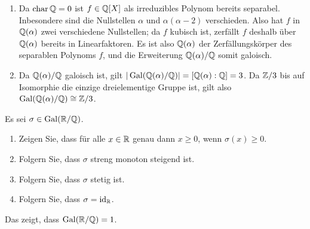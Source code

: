 \begin{solution}
\begin{enumerate}
    \item
      Da $\operatorname{char} \mathbb{Q} = 0$ ist $f \in \mathbb{Q}[X]$ als irreduzibles Polynom bereits separabel.
      Inbesondere sind die Nullstellen $\alpha$ und $\alpha (\alpha - 2)$ verschieden.
      Also hat $f$ in $\mathbb{Q}(\alpha)$ zwei verschiedene Nullstellen; da $f$ kubisch ist, zerfällt $f$ deshalb über $\mathbb{Q}(\alpha)$ bereits in Linearfaktoren.
      Es ist also $\mathbb{Q}(\alpha)$ der Zerfällungskörper des separablen Polynoms $f$, und die Erweiterung $\mathbb{Q}(\alpha)/\mathbb{Q}$ somit galoisch.
%       
    \item
      Da $\mathbb{Q}(\alpha)/\mathbb{Q}$ galoisch ist, gilt $|\operatorname{Gal}(\mathbb{Q}(\alpha)/\mathbb{Q})| = [\mathbb{Q}(\alpha) : \mathbb{Q}] = 3$.
      Da $\mathbb{Z}/3$ bis auf Isomorphie die einzige dreielementige Gruppe ist, gilt also $\operatorname{Gal}(\mathbb{Q}(\alpha)/\mathbb{Q}) \cong \mathbb{Z}/3$.
  \end{enumerate}
\end{solution}


\begin{question}
  Es sei $\sigma \in \operatorname{Gal}(\mathbb{R}/\mathbb{Q})$.
  \begin{enumerate}
    \item
      Zeigen Sie, dass für alle $x \in \mathbb{R}$ genau dann $x \geq 0$, wenn $\sigma(x) \geq 0$.
    \item
      Folgern Sie, dass $\sigma$ streng monoton steigend ist.
    \item
      Folgern Sie, dass $\sigma$ stetig ist.
    \item
      Folgern Sie, dass $\sigma = \operatorname{id}_{\mathbb{R}}$.
  \end{enumerate}
  Das zeigt, dass $\operatorname{Gal}(\mathbb{R}/\mathbb{Q}) = 1$.
\end{question}


